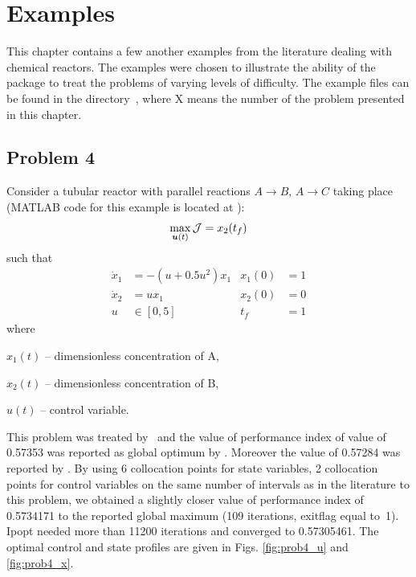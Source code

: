 \chapter{Examples}
\label{cha:examples}


This chapter contains a few another examples from the literature
dealing with chemical reactors. The examples were chosen to
illustrate the ability of the~ package to treat the
problems of varying levels of difficulty. The example files can be
found in the directory~, where X means the
number of the problem presented in this chapter.

\section{Problem 4}
\label{sec:prob4}

Consider a tubular reactor with  parallel
reactions $A \rightarrow B$, $A \rightarrow C$ taking place
\citep{raj01,dad95,log89} (MATLAB code for this example is located
at ):
\begin{equation}
\max_{\ve{u}(t)} \mf{J} = x_{2}(t_{f}) \label{eq:tubular}
\end{equation}
such that
\begin{align*}
\dot{x}_1 &=-(u+0.5u^2)x_{1} &x_1(0) &= 1 \\
\dot{x}_2 &=ux_1 &x_2(0) &= 0 \\
u &\in [0,5] & t_f &=1
\end{align*}
where 
\begin{description}
\item $x_{1}(t)$ -- dimensionless concentration of A,
\item $x_{2}(t)$ -- dimensionless concentration of B,
\item $u(t)$ -- control variable.
\end{description}

This problem was treated by~\cite{dad95,log89,raj01} and the value of
performance index of value of 0.57353 was reported as global optimum
by \cite{dad95}. Moreover the value of 0.57284 was reported by
\cite{raj01}. By using 6 collocation points for state variables,
2 collocation points for control variables on the same number of
intervals as in the literature to this problem, we obtained a slightly
closer value of performance index of 0.5734171 to the reported global
maximum (109 iterations, exitflag equal to~1). Ipopt needed more than
11200 iterations and converged to 0.57305461.  
The optimal control
and state profiles are given in Figs. \ref{fig:prob4_u} and
\ref{fig:prob4_x}.

